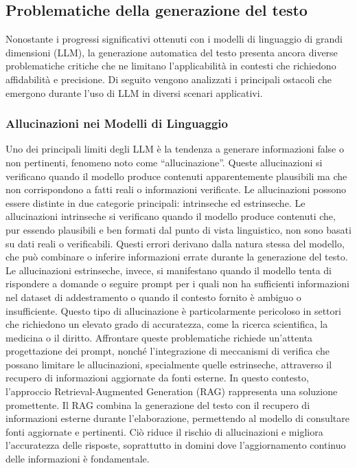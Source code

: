 \documentclass[target=mst,aauheader=,style=]{thud}
\begin{document}
\subsection{Problematiche della generazione del testo}
Nonostante i progressi significativi ottenuti con i modelli di linguaggio di grandi dimensioni (LLM), la generazione automatica del testo presenta ancora diverse problematiche critiche che ne limitano l’applicabilità in contesti che richiedono affidabilità e precisione. Di seguito vengono analizzati i principali ostacoli che emergono durante l’uso di LLM in diversi scenari applicativi.

\subsubsection{Allucinazioni nei Modelli di Linguaggio}
Uno dei principali limiti degli LLM è la tendenza a generare informazioni false o non pertinenti, fenomeno noto come “allucinazione”. Queste allucinazioni si verificano quando il modello produce contenuti apparentemente plausibili ma che non corrispondono a fatti reali o informazioni verificate. Le allucinazioni possono essere distinte in due categorie principali: intrinseche ed estrinseche. Le allucinazioni intrinseche si verificano quando il modello produce contenuti che, pur essendo plausibili e ben formati dal punto di vista linguistico, non sono basati su dati reali o verificabili. Questi errori derivano dalla natura stessa del modello, che può combinare o inferire informazioni errate durante la generazione del testo. Le allucinazioni estrinseche, invece, si manifestano quando il modello tenta di rispondere a domande o seguire prompt per i quali non ha sufficienti informazioni nel dataset di addestramento o quando il contesto fornito è ambiguo o insufficiente. Questo tipo di allucinazione è particolarmente pericoloso in settori che richiedono un elevato grado di accuratezza, come la ricerca scientifica, la medicina o il diritto.
Affrontare queste problematiche richiede un’attenta progettazione dei prompt, nonché l’integrazione di meccanismi di verifica che possano limitare le allucinazioni, specialmente quelle estrinseche, attraverso il recupero di informazioni aggiornate da fonti esterne. In questo contesto, l’approccio Retrieval-Augmented Generation (RAG) rappresenta una soluzione promettente. Il RAG combina la generazione del testo con il recupero di informazioni esterne durante l’elaborazione, permettendo al modello di consultare fonti aggiornate e pertinenti. Ciò riduce il rischio di allucinazioni e migliora l’accuratezza delle risposte, soprattutto in domini dove l’aggiornamento continuo delle informazioni è fondamentale.\cite{ji_2023}
\end{document}
